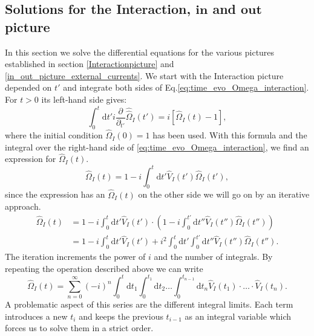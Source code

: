 \documentclass[12pt, titlepage]{article}
\begin{document}
\subsection{Solutions for the Interaction, $ \pmb{in} $  and $ \pmb{out} $ picture}\label{solutions_interaction_in_out}
In this section we solve the differential equations for the various pictures established in section \ref{Interactionpicture} and \ref{in_out_picture_external_currents}.
We start with the Interaction picture depended on $ t' $  and integrate both sides of Eq.\enskip\eqref{eq:time_evo_Omega_interaction}. For $ t>0 $ its left-hand side gives:
\begin{equation}\label{first_term_left_Omega_time_order}
\int_{0}^{t}\mathrm{d}t'
 i 
 \frac{\partial}{\partial_{t'}} 
 \hat{\hat{\Omega}}_{I} (t')
 =
 i
 \left[ 
\hat{\Omega}_{I}(t) -1
 \right] 
 ,
\end{equation}
where the initial condition $ \hat{\Omega}_{I}(0)=1 $ has been used.
With this formula and the integral over the right-hand side of \eqref{eq:time_evo_Omega_interaction}, we find an expression for $ \hat{\Omega}_{I}(t) $.
\begin{equation}
\hat{\Omega}_{I}(t)=
1
-
i
\int_{0}^{t}\mathrm{d}t'\hat{V}_{I}(t')\hat{\Omega}_{I}(t')	,
\end{equation}
since the expression has an $ \hat{\Omega}_{I}(t) $ on the other side we will go on by an iterative approach.
\begin{equation}\label{Omega_first_terms}
\begin{split}
\hat{\Omega}_{I}(t)
&=
1
-
i 
\int_{0}^{t}\mathrm{d}t'\hat{V}_{I}(t')
\cdot
\left( 
1
-
i
\int_{0}^{t'}\mathrm{d}t''\hat{V}_{I}(t'')\hat{\Omega}_{I}(t'')
\right) 
\\
&=
1
-
i
\int_{0}^{t}\mathrm{d}t'\hat{V}_{I}(t')
+i^{2} 
\int_{0}^{t}\mathrm{d}t'
\int_{0}^{t'}\mathrm{d}t''
\hat{V}_{I}(t'')\hat{\Omega}_{I}(t'')
.
\end{split}
\end{equation}
The iteration increments the power of $ i $ and the number of integrals. By repeating the operation described above we can write
\begin{equation}\label{Omega_different_t}
\hat{\Omega}_{I}(t) =
\sum\limits_{n=0}^{\infty} 
(-i)^{n}
\int_{0}^{t}\mathrm{d}t_1\int_{0}^{t_{1}}\! \! \mathrm{d}t_2
 \ldots
 \int_{0}^{t_{n-1}}\! \! \mathrm{d}t_n
  \hat{V}_{I}(t_1)\cdot \ldots \cdot \hat{V}_{I}(t_n)
  .
\end{equation}
A problematic aspect of this series are the different integral limits. Each term introduces a new $ t_{i} $ and keeps the previous $ t_{i-1} $ as an integral variable which forces us to solve them in a strict order. 
\end{document}
